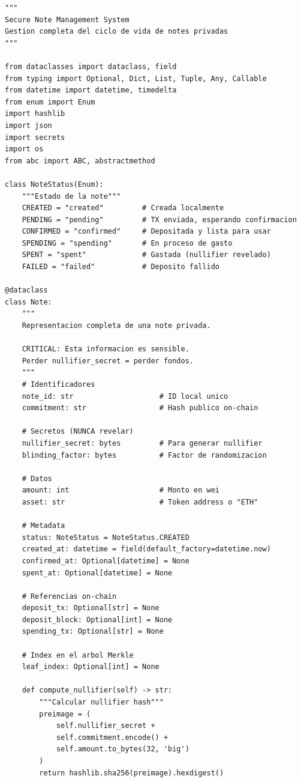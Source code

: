 \documentclass[11pt,a4paper,twoside]{book}
\theoremstyle{definition}
\theoremstyle{remark}
\begin{document}
\begin{lstlisting}[style=python, caption={Sistema completo de gestión de notes}]
"""
Secure Note Management System
Gestion completa del ciclo de vida de notes privadas
"""

from dataclasses import dataclass, field
from typing import Optional, Dict, List, Tuple, Any, Callable
from datetime import datetime, timedelta
from enum import Enum
import hashlib
import json
import secrets
import os
from abc import ABC, abstractmethod

class NoteStatus(Enum):
    """Estado de la note"""
    CREATED = "created"         # Creada localmente
    PENDING = "pending"         # TX enviada, esperando confirmacion
    CONFIRMED = "confirmed"     # Depositada y lista para usar
    SPENDING = "spending"       # En proceso de gasto
    SPENT = "spent"             # Gastada (nullifier revelado)
    FAILED = "failed"           # Deposito fallido

@dataclass
class Note:
    """
    Representacion completa de una note privada.
    
    CRITICAL: Esta informacion es sensible.
    Perder nullifier_secret = perder fondos.
    """
    # Identificadores
    note_id: str                    # ID local unico
    commitment: str                 # Hash publico on-chain
    
    # Secretos (NUNCA revelar)
    nullifier_secret: bytes         # Para generar nullifier
    blinding_factor: bytes          # Factor de randomizacion
    
    # Datos
    amount: int                     # Monto en wei
    asset: str                      # Token address o "ETH"
    
    # Metadata
    status: NoteStatus = NoteStatus.CREATED
    created_at: datetime = field(default_factory=datetime.now)
    confirmed_at: Optional[datetime] = None
    spent_at: Optional[datetime] = None
    
    # Referencias on-chain
    deposit_tx: Optional[str] = None
    deposit_block: Optional[int] = None
    spending_tx: Optional[str] = None
    
    # Index en el arbol Merkle
    leaf_index: Optional[int] = None
    
    def compute_nullifier(self) -> str:
        """Calcular nullifier hash"""
        preimage = (
            self.nullifier_secret +
            self.commitment.encode() +
            self.amount.to_bytes(32, 'big')
        )
        return hashlib.sha256(preimage).hexdigest()
    

\end{lstlisting}
\end{document}

